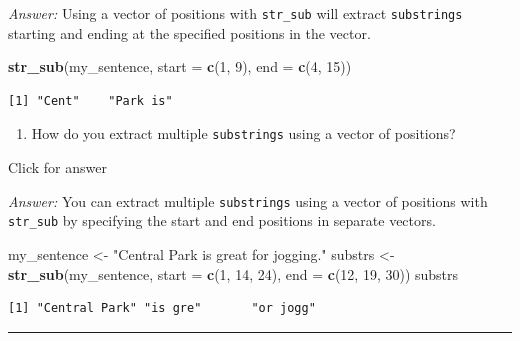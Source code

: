 \documentclass[
]{book}
\newenvironment{Shaded}{\begin{snugshade}}{\end{snugshade}}
\newcommand{\AttributeTok}[1]{\textcolor[rgb]{0.13,0.29,0.53}{#1}}
\newcommand{\DecValTok}[1]{\textcolor[rgb]{0.00,0.00,0.81}{#1}}
\newcommand{\FunctionTok}[1]{\textcolor[rgb]{0.13,0.29,0.53}{\textbf{#1}}}
\newcommand{\NormalTok}[1]{#1}
\newcommand{\OtherTok}[1]{\textcolor[rgb]{0.56,0.35,0.01}{#1}}
\newcommand{\StringTok}[1]{\textcolor[rgb]{0.31,0.60,0.02}{#1}}
\providecommand{\tightlist}{%
  \setlength{\itemsep}{0pt}\setlength{\parskip}{0pt}}
\begin{document}
\emph{Answer:} Using a vector of positions with \texttt{str\_sub} will extract \texttt{substrings} starting and ending at the specified positions in the vector.

\begin{Shaded}
\begin{Highlighting}[]
\FunctionTok{str\_sub}\NormalTok{(my\_sentence, }\AttributeTok{start =} \FunctionTok{c}\NormalTok{(}\DecValTok{1}\NormalTok{, }\DecValTok{9}\NormalTok{), }\AttributeTok{end =} \FunctionTok{c}\NormalTok{(}\DecValTok{4}\NormalTok{, }\DecValTok{15}\NormalTok{))}
\end{Highlighting}
\end{Shaded}

\begin{verbatim}
[1] "Cent"    "Park is"
\end{verbatim}

\begin{enumerate}
\def\labelenumi{\alph{enumi}.}
\setcounter{enumi}{9}
\tightlist
\item
  How do you extract multiple \texttt{substrings} using a vector of positions?
\end{enumerate}

Click for answer

\emph{Answer:} You can extract multiple \texttt{substrings} using a vector of positions with \texttt{str\_sub} by specifying the start and end positions in separate vectors.

\begin{Shaded}
\begin{Highlighting}[]
\NormalTok{my\_sentence }\OtherTok{\textless{}{-}} \StringTok{"Central Park is great for jogging."}
\NormalTok{substrs }\OtherTok{\textless{}{-}} \FunctionTok{str\_sub}\NormalTok{(my\_sentence, }\AttributeTok{start =} \FunctionTok{c}\NormalTok{(}\DecValTok{1}\NormalTok{, }\DecValTok{14}\NormalTok{, }\DecValTok{24}\NormalTok{), }\AttributeTok{end =} \FunctionTok{c}\NormalTok{(}\DecValTok{12}\NormalTok{, }\DecValTok{19}\NormalTok{, }\DecValTok{30}\NormalTok{))}
\NormalTok{substrs}
\end{Highlighting}
\end{Shaded}

\begin{verbatim}
[1] "Central Park" "is gre"       "or jogg"     
\end{verbatim}

\begin{center}\rule{0.5\linewidth}{0.5pt}\end{center}
\end{document}
